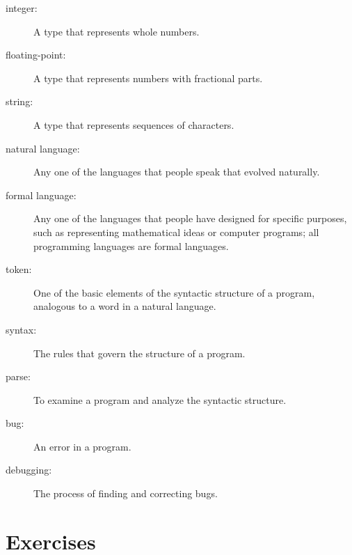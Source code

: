 \begin{description}
\item[integer:] A type that represents whole numbers.

\item[floating-point:] A type that represents numbers with fractional
parts.

\item[string:] A type that represents sequences of characters.

\item[natural language:]  Any one of the languages that people speak that
evolved naturally.

\item[formal language:]  Any one of the languages that people have designed
for specific purposes, such as representing mathematical ideas or
computer programs; all programming languages are formal languages.

\item[token:]  One of the basic elements of the syntactic structure of
a program, analogous to a word in a natural language.

\item[syntax:] The rules that govern the structure of a program.

\item[parse:] To examine a program and analyze the syntactic structure.

\item[bug:] An error in a program.

\item[debugging:] The process of finding and correcting bugs.

\end{description}


\section{Exercises}

